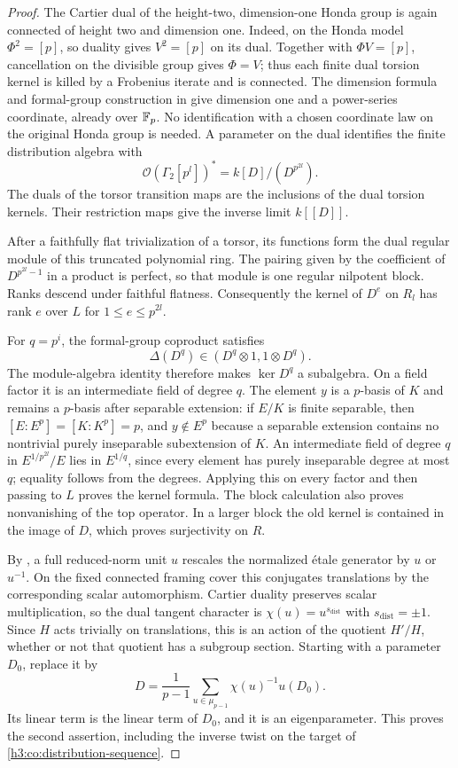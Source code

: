 \begin{proof}
The Cartier dual of the height-two, dimension-one Honda group is again
connected of height two and dimension one. Indeed, on the Honda model
$\Phi^2=[p]$, so duality gives $V^2=[p]$ on its dual. Together with
$\Phi V=[p]$, cancellation on the divisible group gives $\Phi=V$;
thus each finite dual torsion kernel is killed by a Frobenius iterate
and is connected. The dimension formula and formal-group construction
in \cite[Section~2.2, Proposition~1, and Section~2.3, Proposition~3]{Tate1967PDivisible}
give dimension one and a power-series coordinate, already over $\mathbb F_p$.
No identification with a chosen coordinate law on the original Honda
group is needed. A parameter on the dual identifies
the finite distribution algebra with
\[
 \mathcal O(\Gamma_2[p^l])^*
 =k[D]/(D^{p^{2l}}).
\]
The duals of the torsor transition maps are the inclusions of the dual
torsion kernels.  Their restriction maps give the inverse limit
$k[[D]]$.

After a faithfully flat trivialization of a torsor, its functions form
the dual regular module of this truncated polynomial ring.  The pairing
given by the coefficient of $D^{p^{2l}-1}$ in a product is perfect, so
that module is one regular nilpotent block.  Ranks descend under faithful
flatness.  Consequently the kernel of $D^e$ on $R_l$ has rank $e$ over
$L$ for $1\leq e\leq p^{2l}$.

For $q=p^i$, the formal-group coproduct satisfies
\[
 \Delta(D^q)\in(D^q\otimes1,1\otimes D^q).
\]
The module-algebra identity therefore makes $\ker D^q$ a subalgebra.
On a field factor it is an intermediate field of degree $q$.
The element $y$ is a $p$-basis of $K$ and remains a $p$-basis after
separable extension: if $E/K$ is finite separable, then
$[E:E^p]=[K:K^p]=p$, and $y\notin E^p$ because a separable extension
contains no nontrivial purely inseparable subextension of $K$.
An intermediate field of degree $q$ in $E^{1/p^{2l}}/E$ lies in
$E^{1/q}$, since every element has purely inseparable degree at most
$q$; equality follows from the degrees.  Applying this on every factor
and then passing to $L$ proves the kernel formula.  The block calculation
also proves nonvanishing of the top operator.  In a larger block the
old kernel is contained in the image of $D$, which proves surjectivity
on $R$.

By , a full reduced-norm unit $u$ rescales the
normalized \'etale generator by $u$ or $u^{-1}$.  On the fixed connected
framing cover this conjugates translations by the corresponding scalar
automorphism.  Cartier duality preserves scalar multiplication, so the
dual tangent character is $\chi(u)=u^{s_{\mathrm{dist}}}$ with $s_{\mathrm{dist}}=\pm1$.
Since $H$ acts trivially on translations, this is an action of the
quotient $H'/H$, whether or not that quotient has a subgroup section.
Starting with a parameter $D_0$, replace it by
\[
 D=\frac1{p-1}\sum_{u\in\mu_{p-1}}
       \chi(u)^{-1}u(D_0).
\]
Its linear term is the linear term of $D_0$, and it is an eigenparameter.
This proves the second assertion, including the inverse twist on the
target of \eqref{h3:co:distribution-sequence}.


\end{proof}
